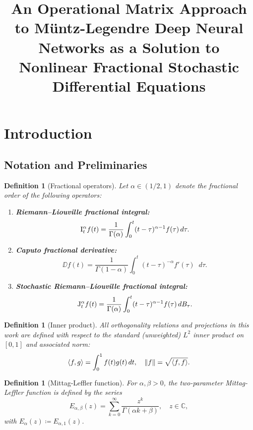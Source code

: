 \documentclass[11pt, a4paper]{article}
\title{An Operational Matrix Approach to M\"untz-Legendre Deep Neural Networks as a Solution to Nonlinear Fractional Stochastic Differential Equations}
\date{}
\author{}
\theoremstyle{theoremstyle}
\theoremstyle{definitionstyle}
\newtheorem{definition}[theorem]{Definition}
\newcommand{\dd}{\mathop{}\!d}
\DeclarePairedDelimiter{\norm}{\lVert}{\rVert}
\begin{document}
\maketitle

\section{Introduction}

\subsection{Notation and Preliminaries}


\begin{definition}[Fractional operators]\label{def:fp}
    Let $\alpha \in (1/2, 1)$ denote the fractional order of the following operators:
    \begin{enumerate}
        \item \textbf{Riemann--Liouville fractional integral:}
        \begin{equation} \II f(t) = \frac{1}{\Gamma(\alpha)} \int_0^t (t-\tau)^{\alpha-1} f(\tau) \dd{\tau}. \end{equation}
        \item \textbf{Caputo fractional derivative:}
        \begin{equation} \DD f(t) = \frac{1}{\Gamma(1-\alpha)} \int_0^t (t-\tau)^{-\alpha} f'(\tau) \dd{\tau}. \end{equation}
        \item \textbf{Stochastic Riemann--Liouville fractional integral:}
        \begin{equation} \JJ f(t) = \frac{1}{\Gamma(\alpha)} \int_0^t (t-\tau)^{\alpha-1} f(\tau) \dd{B_\tau}. \end{equation}
    \end{enumerate}
\end{definition}

\begin{definition}[Inner product]\label{def:ip}
    All orthogonality relations and projections in this work are defined with respect to the standard (unweighted) \( L^2 \) inner product on \( [0,1] \) and associated norm:
    \begin{equation} \langle f, g \rangle = \int_0^1 f(t) g(t) \dd{t}, \quad \norm{f} = \sqrt{\langle f, f \rangle}. \end{equation}
\end{definition}

\begin{definition}[Mittag-Leffler function]\label{def:ml}
    For $\alpha, \beta > 0$, the two-parameter Mittag-Leffler function is defined by the series
    \begin{equation} E_{\alpha,\beta}(z) = \sum_{k=0}^{\infty} \frac{z^k}{\Gamma(\alpha k + \beta)}, \quad z \in \mathbb C, \end{equation}
    with $E_\alpha(z) \coloneqq E_{\alpha,1}(z)$.
\end{definition}
\end{document}
